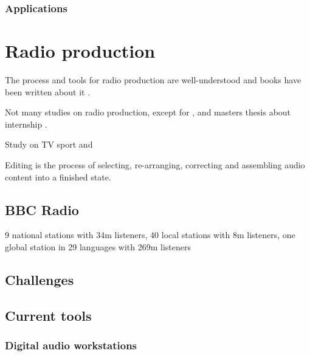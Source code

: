 



\subsubsection{Applications}



\section{Radio production}

The process and tools for radio production are well-understood and books have been written about it
\citep{McLeish2015,Hausman2012}.

Not many studies on radio production, except for \citet{Dunaway2000}, \citet{Barbour2004} and masters thesis about
internship \citet{Sampaio2016}.

Study on TV sport \citep{Perry2009} and \citep{Engstroem2010}


Editing is the process of selecting, re-arranging, correcting and assembling audio content into a finished state.

\subsection{BBC Radio}

9 national stations with 34m listeners, 40 local stations with 8m listeners, one global station in 29 languages with
269m listeners

\subsection{Challenges}

\subsection{Current tools}

\subsubsection{Digital audio workstations}

